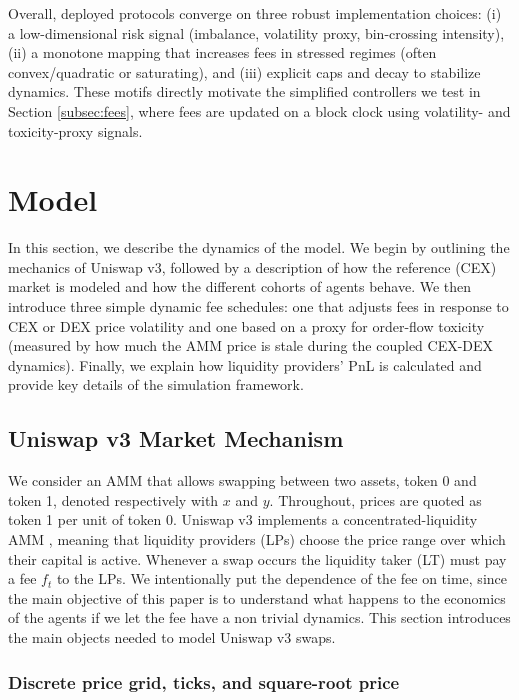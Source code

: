 \documentclass[11pt]{article}
\begin{document}
Overall, deployed protocols converge on three robust implementation choices: (i) a low-dimensional risk signal (imbalance, volatility proxy, bin-crossing intensity), (ii) a monotone mapping that increases fees in stressed regimes (often convex/quadratic or saturating), and (iii) explicit caps and decay to stabilize dynamics. These motifs directly motivate the simplified controllers we test in Section \ref{subsec:fees}, where fees are updated on a block clock using volatility- and toxicity-proxy signals.


\section{Model}
In this section, we describe the dynamics of the model. We begin by outlining the mechanics of Uniswap v3, followed by a description of how the reference (CEX) market is modeled and how the different cohorts of agents behave. We then introduce three simple dynamic fee schedules: one that adjusts fees in response to CEX or DEX price volatility and one based on a proxy for order-flow toxicity (measured by how much the AMM price is stale during the coupled CEX-DEX dynamics). Finally, we explain how liquidity providers’ PnL is calculated and provide key details of the simulation framework.
\label{sec:model}

\subsection{Uniswap v3 Market Mechanism}
\label{subsec:univ3}

We consider an AMM that allows swapping between two assets, token 0 and token 1, denoted respectively with $x$ and $y$. Throughout, prices are quoted as token 1 per unit of token 0. Uniswap v3 implements a concentrated-liquidity AMM \cite{adams2021}, meaning that liquidity providers (LPs) choose the price range over which their capital is active. Whenever a swap occurs
the liquidity taker (LT) must pay a fee $f_t$ to the LPs. We intentionally put the dependence of the fee on time, since the main objective of this paper is to understand what happens to the economics of the agents if we let the fee have a non trivial dynamics. This section introduces the main objects needed to model Uniswap v3 swaps.

\subsubsection{Discrete price grid, ticks, and square-root price}
\end{document}

